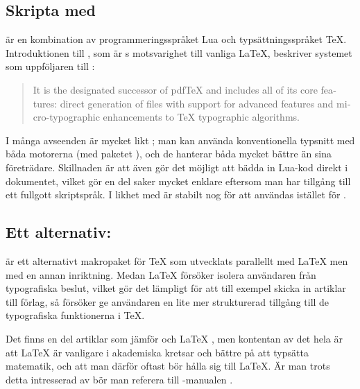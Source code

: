 \documentclass[10pt,../../a4.tex]{subfiles}
\begin{document}
\subsection{Skripta med }
 är en kombination av programmeringsspråket Lua och
typsättningsspråket \TeX. Introduktionen till ,
som är s motsvarighet till vanliga \LaTeX,
beskriver systemet som uppföljaren till \pdfLaTeX:
\begin{quote}
	\begin{english}
		It is the designated successor of pdf\TeX{} and includes all of 
		its core features: direct generation of \PDF files with support 
		for advanced \PDF features and micro-typographic enhancements to 
		\TeX{} typographic algorithms.

		\nopagebreak
		\hfill\textcite{Gonnard10}\hspace{-1ex}%
	\end{english}
\end{quote}

I många avseenden är  mycket likt \XeTeX; man kan använda
konventionella typsnitt med båda motorerna (med paketet ), 
och de hanterar båda \UTF 
mycket bättre än sina företrädare. Skillnaden är att 
även gör det möjligt att bädda in Lua-kod direkt i dokumentet, vilket gör
en del saker mycket enklare eftersom man har tillgång till ett fullgott
skriptspråk. I likhet med \XeTeX är  stabilt nog för att
användas istället för \pdfLaTeX.

\subsection{Ett alternativ: }
 är ett alternativt makropaket för \TeX{} som utvecklats
parallellt med \LaTeX{} men med en annan inriktning. Medan \LaTeX{}
försöker isolera användaren från typografiska beslut, vilket gör det
lämpligt för att till exempel skicka in artiklar till förlag, så
försöker  ge användaren en lite mer strukturerad tillgång
till de typografiska funktionerna i \TeX.

Det finns en del artiklar som jämför  och \LaTeX{}
\parencite[till exempel][]{Hoekwater98}, men kontentan av det hela är att
\LaTeX{} är vanligare i akademiska kretsar och bättre på att typsätta
matematik, och att man därför oftast bör hålla sig till \LaTeX. Är man
trots detta intresserad av  bör man referera till
-manualen \parencite{Hagen01}.
\end{document}

